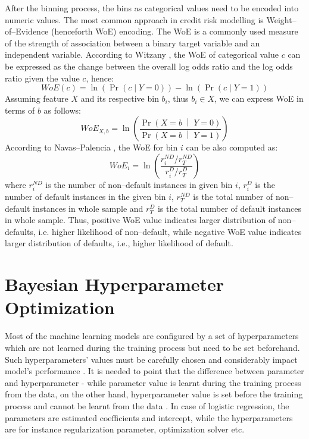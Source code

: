 After the binning process, the bins as categorical values need to be encoded into numeric values. The most common approach in credit risk modelling is Weight--of--Evidence (henceforth WoE) encoding. The WoE is a commonly used measure of the strength of association between a binary target variable and an independent variable.
According to Witzany \citep{witzany2017credit}, the WoE of categorical value $c$ can be expressed as the change between the overall log odds ratio and the log odds ratio given the value $c$, hence:
\begin{equation}\label{eq}
    WoE\left(c\right) = \ln\left(\operatorname{Pr}\left(c \mid Y = 0 \right) \right) - \ln\left(\operatorname{Pr}\left(c \mid Y = 1 \right) \right)
\end{equation}
Assuming feature $X$ and its respective bin $b_i$, thus $b_i \in X$, we can express WoE in terms of $b$ as follows:
\begin{equation}\label{eq}
    WoE_{X, b}= \ln \left(\frac{\Pr{\left(X = b\;\middle|\;Y = 0\right)}}{\Pr{\left(X = b\;\middle|\;Y = 1\right)}}\right)
\end{equation}
According to Navas--Palencia \citep{navas2020optimal}, the WoE for bin $i$ can be also computed as:
\begin{equation}\label{eq}
    WoE_{i} = \ln \left( \frac{r^{ND}_i / r^{ND}_T} {r^{D}_i / r^{D}_T}  \right)
\end{equation}
where $r^{ND}_i$ is the number of non--default instances in given bin $i$, $r^{D}_i$ is the number of default instances in the given bin $i$, $r^{ND}_T$ is the total number of non--default instances in whole sample and $r^{D}_T$ is the total number of default instances in whole sample.
Thus, positive WoE value indicates larger distribution of non--defaults, i.e. higher likelihood of non--default, while negative WoE value indicates larger distribution of defaults, i.e., higher likelihood of default.

\newpage
\section{Bayesian Hyperparameter Optimization}
\label{sec:bayesoptheory}
Most of the machine learning models are configured by a set of hyperparameters which are not learned during the training process but need to be set beforehand. Such hyperparameters' values must be carefully chosen and considerably impact model's performance \citep{bischl2023hyperparameter}.
It is needed to point that the difference between parameter and hyperparameter - while parameter value is learnt during the training process from the data, on the other hand, hyperparameter value is set before the training process and cannot be learnt from the data \citep{owen2022hyperparameter}. In case of logistic regression, the parameters are estimated coefficients and intercept, while the hyperparameters are for instance regularization parameter, optimization solver etc.

